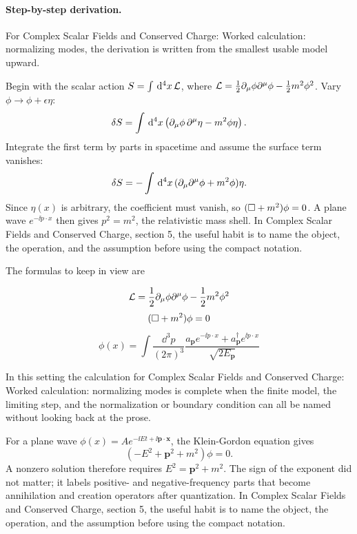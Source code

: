 \paragraph{Step-by-step derivation.}

For Complex Scalar Fields and Conserved Charge: Worked calculation: normalizing modes, the derivation is written from the smallest usable model upward.

Begin with the scalar action \(S=\int\,\mathrm d^4x\,\mathcal L\), where \(\mathcal L=\frac12\partial_\mu\phi\partial^\mu\phi-\frac12m^2\phi^2\).  Vary \(\phi\to\phi+\epsilon\eta\):
\[
  \delta S=\int\,\mathrm d^4x\left(\partial_\mu\phi\,\partial^\mu\eta-m^2\phi\eta\right).
\]
Integrate the first term by parts in spacetime and assume the surface term vanishes:
\[
  \delta S=-\int\,\mathrm d^4x\,(\partial_\mu\partial^\mu\phi+m^2\phi)\eta.
\]
Since \(\eta(x)\) is arbitrary, the coefficient must vanish, so \((\Box+m^2)\phi=0\).  A plane wave \(e^{-\ii p\cdot x}\) then gives \(p^2=m^2\), the relativistic mass shell.  In Complex Scalar Fields and Conserved Charge, section 5, the useful habit is to name the object, the operation, and the assumption before using the compact notation.

The formulas to keep in view are

\[
  \mathcal L=\frac12\partial_\mu\phi\partial^\mu\phi-\frac12m^2\phi^2
\]
\[
  (\Box+m^2)\phi=0
\]
\[
  \phi(x)=\int\frac{\dd^3p}{(2\pi)^3}\frac{a_{\bm p}e^{-\ii p\cdot x}+a_{\bm p}^\dagger e^{\ii p\cdot x}}{\sqrt{2E_{\bm p}}}
\]

In this setting the calculation for Complex Scalar Fields and Conserved Charge: Worked calculation: normalizing modes is complete when the finite model, the limiting step, and the normalization or boundary condition can all be named without looking back at the prose.




\begin{example}
For a plane wave \(\phi(x)=Ae^{-\ii Et+\ii\bm p\cdot\bm x}\), the Klein-Gordon equation gives
\[
  (-E^2+\bm p^2+m^2)\phi=0.
\]
A nonzero solution therefore requires \(E^2=\bm p^2+m^2\).  The sign of the exponent did not matter; it labels positive- and negative-frequency parts that become annihilation and creation operators after quantization.  In Complex Scalar Fields and Conserved Charge, section 5, the useful habit is to name the object, the operation, and the assumption before using the compact notation.
\end{example}



